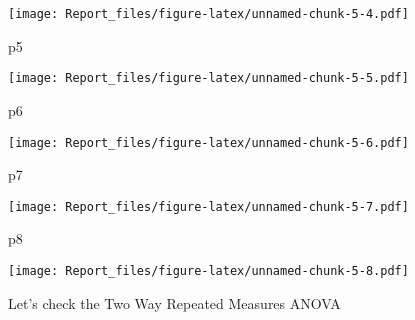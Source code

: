 \documentclass[
]{article}
\newenvironment{Shaded}{\begin{snugshade}}{\end{snugshade}}
\newcommand{\DataTypeTok}[1]{\textcolor[rgb]{0.13,0.29,0.53}{#1}}
\newcommand{\KeywordTok}[1]{\textcolor[rgb]{0.13,0.29,0.53}{\textbf{#1}}}
\newcommand{\NormalTok}[1]{#1}
\newcommand{\OperatorTok}[1]{\textcolor[rgb]{0.81,0.36,0.00}{\textbf{#1}}}
\newcommand{\StringTok}[1]{\textcolor[rgb]{0.31,0.60,0.02}{#1}}
\begin{document}
\texttt{[image: Report\_files/figure-latex/unnamed-chunk-5-4.pdf]}

\begin{Shaded}
\begin{Highlighting}[]
\NormalTok{p5 }
\end{Highlighting}
\end{Shaded}

\texttt{[image: Report\_files/figure-latex/unnamed-chunk-5-5.pdf]}

\begin{Shaded}
\begin{Highlighting}[]
\NormalTok{p6}
\end{Highlighting}
\end{Shaded}

\texttt{[image: Report\_files/figure-latex/unnamed-chunk-5-6.pdf]}

\begin{Shaded}
\begin{Highlighting}[]
\NormalTok{p7}
\end{Highlighting}
\end{Shaded}

\texttt{[image: Report\_files/figure-latex/unnamed-chunk-5-7.pdf]}

\begin{Shaded}
\begin{Highlighting}[]
\NormalTok{p8}
\end{Highlighting}
\end{Shaded}

\texttt{[image: Report\_files/figure-latex/unnamed-chunk-5-8.pdf]}

Let's check the Two Way Repeated Measures ANOVA

\begin{Shaded}
\end{Shaded}
\end{document}
